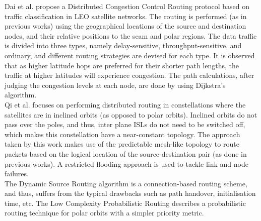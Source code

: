 \documentclass[10pt,conference, final, letterpaper]{IEEEtran}
\begin{document}
Dai et al.\cite{traffic_classification} propose a Distributed Congestion Control Routing protocol based on traffic classification in LEO satellite networks. The routing is performed (as in previous works) using the geographical locations of the source and destination nodes, and their relative positions to the seam and polar regions. The data traffic is divided into three types, namely delay-sensitive, throughput-sensitive, and ordinary, and different routing strategies are devised for each type. It is observed that as higher latitude hops are preferred for their shorter path lengths, the traffic at higher latitudes will experience congestion. The path calculations, after judging the congestion levels at each node, are done by using Dijkstra's algorithm.\\
Qi et al.\cite{survivable_inclined} focuses on performing distributed routing in constellations where the satellites are in inclined orbits (as opposed to polar orbits). Inclined orbits do not pass over the poles, and thus, inter plane ISLs do not need to be switched off, which makes this constellation have a near-constant topology. The approach taken by this work makes use of the predictable mesh-like topology to route packets based on the logical location of the source-destination pair (as done in previous works). A restricted flooding approach is used to tackle link and node failures.\\
The Dynamic Source Routing algorithm \cite{DSRSC} is a connection-based routing scheme, and thus, suffers from the typical drawbacks such as path handover, initialisation time, etc. The Low Complexity Probabilistic Routing \cite{LCPR} describes a probabilistic routing technique for polar orbits with a simpler priority metric.  
\end{document}
